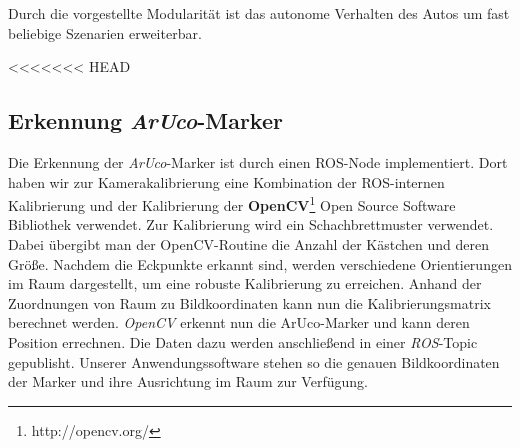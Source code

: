 Durch die vorgestellte Modularität ist das autonome Verhalten des Autos um fast beliebige Szenarien erweiterbar. 

<<<<<<< HEAD
\subsection{Erkennung \textit{ArUco}-Marker}
Die Erkennung der \textit{ArUco}-Marker ist durch einen ROS-Node implementiert. Dort haben wir zur Kamerakalibrierung eine Kombination der ROS-internen Kalibrierung und der Kalibrierung der  \textbf{OpenCV}\footnote[1]{http://opencv.org/} Open Source Software Bibliothek verwendet. Zur Kalibrierung wird ein Schachbrettmuster verwendet. Dabei übergibt man der OpenCV-Routine die Anzahl der Kästchen und deren Größe. Nachdem die Eckpunkte erkannt sind, werden verschiedene Orientierungen im Raum dargestellt, um eine robuste Kalibrierung zu erreichen. Anhand der Zuordnungen von Raum zu Bildkoordinaten kann nun die Kalibrierungsmatrix berechnet werden. 
\textit{OpenCV} erkennt nun die ArUco-Marker und kann deren Position errechnen. Die Daten dazu werden anschließend in einer \textit{ROS}-Topic gepublisht. Unserer Anwendungssoftware stehen so die genauen Bildkoordinaten der Marker und ihre Ausrichtung im Raum zur Verfügung.

